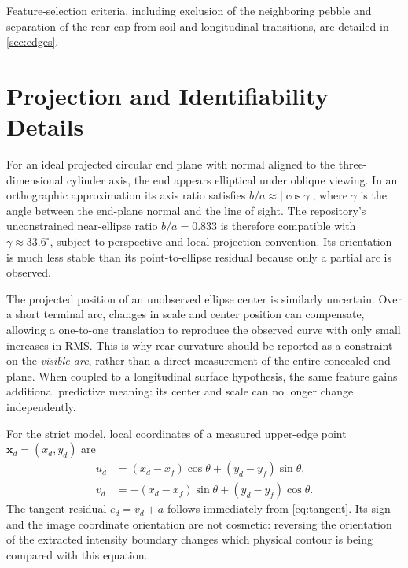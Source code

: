 \documentclass[11pt,letterpaper]{article}
\newcommand{\mat}[1]{\mathbf{#1}}
\begin{document}
Feature-selection criteria, including exclusion of the neighboring pebble and separation of the rear cap from soil and longitudinal transitions, are detailed in \cref{sec:edges}.

\section{Projection and Identifiability Details}
\label{app:projection}

For an ideal projected circular end plane with normal aligned to the three-dimensional cylinder axis, the end appears elliptical under oblique viewing. In an orthographic approximation its axis ratio satisfies \(b/a\approx|\cos\gamma|\), where \(\gamma\) is the angle between the end-plane normal and the line of sight. The repository's unconstrained near-ellipse ratio \(b/a=0.833\) is therefore compatible with \(\gamma\approx33.6^\circ\), subject to perspective and local projection convention. Its orientation is much less stable than its point-to-ellipse residual because only a partial arc is observed.

The projected position of an unobserved ellipse center is similarly uncertain. Over a short terminal arc, changes in scale and center position can compensate, allowing a one-to-one translation to reproduce the observed curve with only small increases in RMS. This is why rear curvature should be reported as a constraint on the \emph{visible arc}, rather than a direct measurement of the entire concealed end plane. When coupled to a longitudinal surface hypothesis, the same feature gains additional predictive meaning: its center and scale can no longer change independently.

For the strict model, local coordinates of a measured upper-edge point \(\mat x_d=(x_d,y_d)\) are
\begin{align}
 u_d&=(x_d-x_f)\cos\theta+(y_d-y_f)\sin\theta,\\
 v_d&=-(x_d-x_f)\sin\theta+(y_d-y_f)\cos\theta.
\end{align}
The tangent residual \(e_d=v_d+a\) follows immediately from \cref{eq:tangent}. Its sign and the image coordinate orientation are not cosmetic: reversing the orientation of the extracted intensity boundary changes which physical contour is being compared with this equation.
\end{document}
